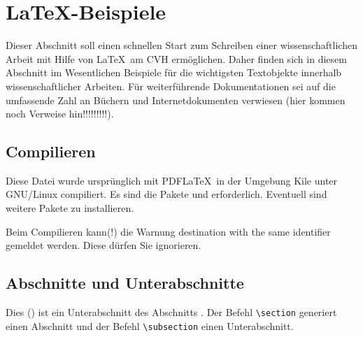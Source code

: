 \section{\texorpdfstring{\LaTeX}{LaTeX}-Beispiele%
         \label{sec:LaTeX-Beispiele}}

Dieser Abschnitt soll einen schnellen Start zum Schreiben einer
wissenschaftlichen Arbeit mit Hilfe von \LaTeX\ am CVH ermöglichen. 
Daher finden sich in diesem Abschnitt im Wesentlichen Beispiele für die
wichtigsten Textobjekte innerhalb wissenschaftlicher Arbeiten. 
Für weiterführende Dokumentationen sei auf die umfassende Zahl an Büchern und
Internetdokumenten verwiesen (hier kommen noch Verweise hin!!!!!!!!!). 

\subsection{Compilieren%
            \label{sec:Compilieren}}

Diese Datei wurde ursprünglich mit PDF\LaTeX\ in der Umgebung Kile unter GNU/Linux compiliert.
Es sind die Pakete  und  erforderlich.
Eventuell sind weitere Pakete zu installieren.
    
Beim Compilieren kann(!) die Warnung %
\glqq{}destination with the same identifier\grqq{}
gemeldet werden. Diese dürfen Sie ignorieren.

\subsection{Abschnitte und Unterabschnitte%
            \label{sec:Abschnitte}}

Dies (\grqq{})
ist ein Unterabschnitt des Abschnitts \grqq{}.
Der Befehl \lstinline|\section| generiert einen Abschnitt und
der Befehl \lstinline|\subsection| einen Unterabschnitt.

